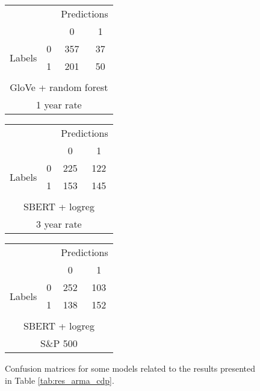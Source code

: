 \begin{figure}[h]
    \centering
    \begin{tabular}{cccc}
     & & \multicolumn{2}{c}{Predictions} \\
     & & \multicolumn{1}{|c|}{0} & \multicolumn{1}{c|}{1}\\
      \cline{2-4}
     \multirow{2}{*}{Labels} & 0 & \multicolumn{1}{|c|}{357} &  \multicolumn{1}{c|}{37} \\
      & 1 & \multicolumn{1}{|c|}{201} & \multicolumn{1}{c|}{50} \\ 
      \\ \multicolumn{4}{c}{GloVe + random forest} \\
      \multicolumn{4}{c}{1 year rate}
\end{tabular} \hspace{1em}
\begin{tabular}{cccc}
     & & \multicolumn{2}{c}{Predictions} \\
     & & \multicolumn{1}{|c|}{0} & \multicolumn{1}{c|}{1}\\
      \cline{2-4}
     \multirow{2}{*}{Labels} & 0 & \multicolumn{1}{|c|}{225} &  \multicolumn{1}{c|}{122} \\
      & 1 & \multicolumn{1}{|c|}{153} & \multicolumn{1}{c|}{145} \\ 
      \\ \multicolumn{4}{c}{SBERT + logreg} \\
      \multicolumn{4}{c}{3 year rate}
\end{tabular} \hspace{1em}
\begin{tabular}{cccc}
     & & \multicolumn{2}{c}{Predictions} \\
     & & \multicolumn{1}{|c|}{0} & \multicolumn{1}{c|}{1}\\
      \cline{2-4}
     \multirow{2}{*}{Labels} & 0 & \multicolumn{1}{|c|}{252} &  \multicolumn{1}{c|}{103} \\
      & 1 & \multicolumn{1}{|c|}{138} & \multicolumn{1}{c|}{152} \\ 
      \\ \multicolumn{4}{c}{SBERT + logreg} \\
      \multicolumn{4}{c}{S\&P 500}
\end{tabular}
    \caption{Confusion matrices for some models related to the results presented in Table \ref{tab:res_arma_cdp}.}
    \label{tab:confmat_arma_cdp}
\end{figure}


